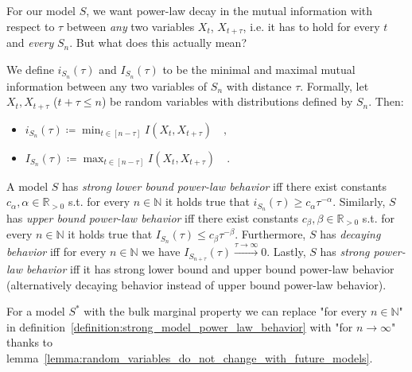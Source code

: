 \documentclass[../../main.tex]{subfiles}
\begin{document}
    For our model $S$, we want power-law decay in the mutual information with respect to $\tau$ between \emph{any} two variables $X_t$, $X_{t + \tau}$, i.e. it has to hold for every $t$ and \emph{every} $S_n$. But what does this actually mean?

    \begin{definition}
        We define $i_{S_n}(\tau)$ and $I_{S_n}(\tau)$ to be the minimal and maximal mutual information between any two variables of $S_n$ with distance $\tau$. Formally, let $X_t, X_{t + \tau}$ ($t + \tau \leq n$) be random variables with distributions defined by $S_n$. Then:
        \vspace{-1em}
        \begin{itemize}
            \item $i_{S_n}(\tau) \coloneqq \min_{t \in [n - \tau]} I(X_t, X_{t + \tau}) \quad ,$
            \item $I_{S_n}(\tau) \coloneqq \max_{t \in [n - \tau]} I(X_t, X_{t + \tau}) \quad .$
        \end{itemize}
    \end{definition}

    \begin{definition}
        \label{definition:strong_model_power_law_behavior}
        A model $S$ has \emph{strong lower bound power-law behavior} iff there exist constants $c_\alpha, \alpha \in \mathbb{R}_{>0}$ s.t. for every $n \in \mathbb{N}$ it holds true that $i_{S_n}(\tau) \geq c_\alpha \tau^{-\alpha}$. Similarly, $S$ has \emph{upper bound power-law behavior} iff there exist constants $c_\beta, \beta \in \mathbb{R}_{>0}$ s.t. for every $n \in \mathbb{N}$ it holds true that $I_{S_n}(\tau) \leq c_\beta \tau^{-\beta}$. Furthermore, $S$ has \emph{decaying behavior} iff for every $n \in \mathbb{N}$ we have $I_{S_{n + \tau}}(\tau) \xrightarrow{\tau \to \infty} 0$. Lastly, $S$ has \emph{strong power-law behavior} iff it has strong lower bound and upper bound power-law behavior (alternatively decaying behavior instead of upper bound power-law behavior).
    \end{definition}

    \begin{remark}
        For a model $S^*$ with the bulk marginal property we can replace "for every $n \in \mathbb{N}$" in definition~\ref{definition:strong_model_power_law_behavior} with "for $n \to \infty$" thanks to lemma~\ref{lemma:random_variables_do_not_change_with_future_models}.
    \end{remark}
\end{document}
